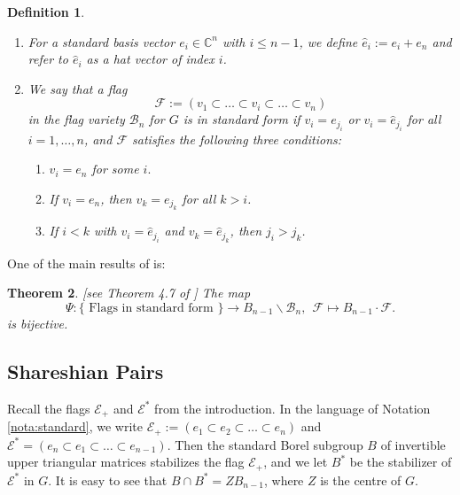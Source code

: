 \documentclass[12pt]{amsart}
\numberwithin{equation}{section}
\newtheorem{thm}{Theorem}[section]
\newtheorem{dfn}[thm]{Definition}
\newcommand{\C}{\mbox{${\mathbb C}$}}
\newcommand{\B}{\mathcal{B}}
\newcommand{\he}{\hat{e}}
\newcommand{\F}{\mathcal{F}}
\begin{document}
\begin{dfn}\label{d:std}
\begin{enumerate}
\item For a standard basis vector $e_{i}\in\C^{n}$ with $i\leq n-1$, we define $\he_{i}:=e_{i}+e_{n}$ and refer to $\he_{i}$ as a hat vector of index $i$.
\item We say that a flag 
\begin{equation}\label{eq:basicflag}
\mathcal{F}:=(v_{1}\subset \dots \subset v_{i}\subset\dots\subset v_{n})
\end{equation}
in the flag variety $\B_n$ for $G$
is in \emph{standard form} if $v_{i}=e_{j_{i}}$ or $v_{i}=\he_{j_{i}}$ for all $i=1,\dots, n$, and 
$\mathcal{F}$ satisfies the following three conditions:
\begin{enumerate}
\item $v_i = e_n$ for some $i.$
\item If $v_{i}=e_{n}$, then $v_{k}=e_{j_{k}}$ for all $k>i$.
 \item If $i<k$ with $v_{i}=\he_{j_{i}}$ and $v_{k}=\he_{j_{k}}$, then $j_{i}>j_{k}$. 
\end{enumerate}
\end{enumerate}
\end{dfn}
\noindent One of the main results of \cite{CE21II} is: 
\begin{thm}\label{thm:standardforms}[see Theorem 4.7 of \cite{CE21II}]
 The map  
\begin{equation*}
\Psi: \{ \text{ Flags in standard form } \} \to B_{n-1}\backslash\B_n, \ \ \mathcal{F}\mapsto B_{n-1}\cdot \F.
\end{equation*}
is bijective.
\end{thm}




\subsection{Shareshian Pairs}\label{ss:Shpairs}
Recall the flags $\mathcal{E}_{+}$ and $\mathcal{E}^{*}$ from the introduction.  
In the language of Notation \ref{nota:standard}, we  write 
$\mathcal{E}_{+}:=(e_{1}\subset e_{2}\subset \dots\subset e_{n})$ and $\mathcal{E}^{*}=(e_{n}\subset e_{1}\subset\dots \subset e_{n-1}).$  Then the standard Borel subgroup $B$ of invertible upper triangular matrices stabilizes the 
flag $\mathcal{E}_{+}$, and we let $B^{*}$ be the stabilizer of $\mathcal{E}^{*}$ in $G$.  
It is easy to see that $B\cap B^{*}=Z B_{n-1}$, where $Z$ is the centre of $G$.    
 
\end{document}
